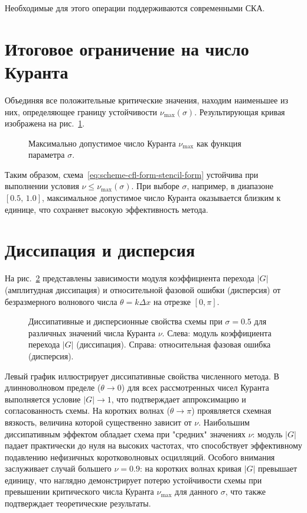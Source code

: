 \documentclass[14pt]{report}
\begin{document}
\vspace{1em}

Необходимые для этого операции поддерживаются современными СКА.

\section{Итоговое ограничение на число Куранта}
Объединяя все положительные критические значения, находим наименьшее из них, определяющее границу устойчивости $\nu_{\max}(\sigma)$. Результирующая кривая изображена на рис.~\ref{fig:cfl-bound-vs-parameter}.

\begin{figure}[ht]
    \centering
    
    \caption{Максимально допустимое число Куранта $\nu_{\max}$ как функция параметра $\sigma$.}
    \label{fig:cfl-bound-vs-parameter}
\end{figure}

Таким образом, схема~\eqref{eq:scheme-cfl-form-stencil-form} устойчива при выполнении условия $\nu \le \nu_{\max}(\sigma)$. При выборе $\sigma$, например, в диапазоне $[0.5,\,1.0]$, максимальное допустимое число Куранта оказывается близким к единице, что сохраняет высокую эффективность метода.


\section{Диссипация и дисперсия}

На рис.~\ref{fig:dissipation-dispersion-profile} представлены зависимости модуля коэффициента перехода $|G|$ (амплитудная диссипация) и относительной фазовой ошибки (дисперсия) от безразмерного волнового числа $\theta = k\Delta x$ на отрезке $[0, \pi]$.


\begin{figure}[ht]
    \centering
    
    \caption{Диссипативные и дисперсионные свойства схемы при $\sigma = 0.5$ для различных значений числа Куранта $\nu$. Слева: модуль коэффициента перехода $|G|$ (диссипация). Справа: относительная фазовая ошибка (дисперсия).}
    \label{fig:dissipation-dispersion-profile}
\end{figure}

Левый график иллюстрирует диссипативные свойства численного метода. В длинноволновом пределе ($\theta \to 0$) для всех рассмотренных чисел Куранта выполняется условие $|G| \to 1$, что подтверждает аппроксимацию и согласованность схемы. На коротких волнах ($\theta \to \pi$) проявляется схемная вязкость, величина которой существенно зависит от $\nu$. Наибольшим диссипативным эффектом обладает схема при "средних" значениях $\nu$: модуль $|G|$ падает практически до нуля на высоких частотах, что способствует эффективному подавлению нефизичных коротковолновых осцилляций. Особого внимания заслуживает случай большего $\nu = 0.9$: на коротких волнах кривая $|G|$ превышает единицу, что наглядно демонстрирует потерю устойчивости схемы при превышении критического числа Куранта $\nu_{\max}$ для данного $\sigma$, что также подтверждает теоретические результаты.
\end{document}
